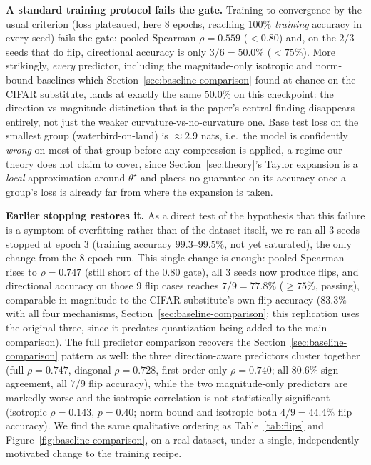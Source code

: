 \documentclass{article}
\newcommand{\theorig}{\theta^\star}
\begin{document}
\textbf{A standard training protocol fails the gate.} Training to convergence by the usual criterion (loss plateaued, here $8$ epochs, reaching $100\%$ \emph{training} accuracy in every seed) fails the gate: pooled Spearman $\rho=0.559$ ($<0.80$) and, on the $2/3$ seeds that do flip, directional accuracy is only $3/6=50.0\%$ ($<75\%$). More strikingly, \emph{every} predictor, including the magnitude-only isotropic and norm-bound baselines which Section~\ref{sec:baseline-comparison} found at chance on the CIFAR substitute, lands at exactly the same $50.0\%$ on this checkpoint: the direction-vs-magnitude distinction that is the paper's central finding disappears entirely, not just the weaker curvature-vs-no-curvature one. Base test loss on the smallest group (waterbird-on-land) is $\approx\!2.9$ nats, i.e.\ the model is confidently \emph{wrong} on most of that group before any compression is applied, a regime our theory does not claim to cover, since Section~\ref{sec:theory}'s Taylor expansion is a \emph{local} approximation around $\theorig$ and places no guarantee on its accuracy once a group's loss is already far from where the expansion is taken.

\textbf{Earlier stopping restores it.} As a direct test of the hypothesis that this failure is a symptom of overfitting rather than of the dataset itself, we re-ran all $3$ seeds stopped at epoch $3$ (training accuracy $99.3$--$99.5\%$, not yet saturated), the only change from the $8$-epoch run. This single change is enough: pooled Spearman rises to $\rho=0.747$ (still short of the $0.80$ gate), all $3$ seeds now produce flips, and directional accuracy on those $9$ flip cases reaches $7/9=77.8\%$ ($\geq75\%$, passing), comparable in magnitude to the CIFAR substitute's own flip accuracy ($83.3\%$ with all four mechanisms, Section~\ref{sec:baseline-comparison}; this replication uses the original three, since it predates quantization being added to the main comparison). The full predictor comparison recovers the Section~\ref{sec:baseline-comparison} pattern as well: the three direction-aware predictors cluster together (full $\rho=0.747$, diagonal $\rho=0.728$, first-order-only $\rho=0.740$; all $80.6\%$ sign-agreement, all $7/9$ flip accuracy), while the two magnitude-only predictors are markedly worse and the isotropic correlation is not statistically significant (isotropic $\rho=0.143$, $p=0.40$; norm bound and isotropic both $4/9=44.4\%$ flip accuracy). We find the same qualitative ordering as Table~\ref{tab:flips} and Figure~\ref{fig:baseline-comparison}, on a real dataset, under a single, independently-motivated change to the training recipe.
\end{document}
